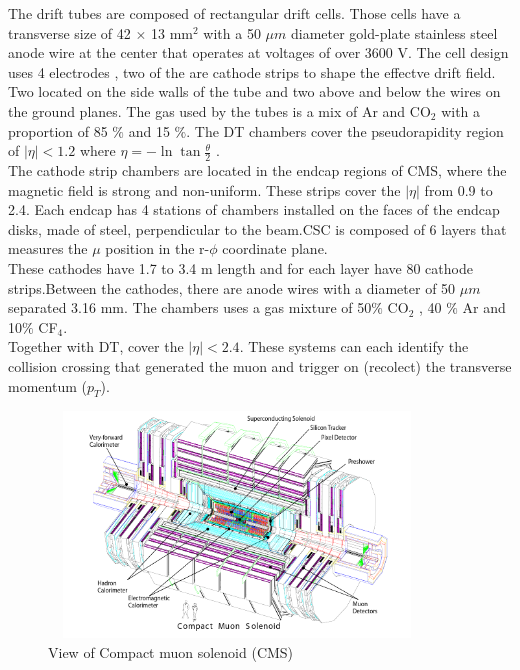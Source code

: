 \begin{linenumbers}
The drift tubes are composed of rectangular drift cells. Those cells have a transverse size of 42 $\times$ 13 mm$^2$ with a 50 $\mu m$ diameter gold-plate stainless steel anode wire at the center that operates at voltages of over 3600 V. The cell design uses 4 electrodes , two of the are cathode strips to shape the effectve drift field. Two located on the side walls of the tube and two above and below the wires on the ground planes. The gas used by the tubes is a mix of Ar and CO$_2$ with a proportion of 85 $\%$ and 15 $\%$. The DT chambers cover the pseudorapidity region of $|\eta|<1.2$ where $\eta=-\ln{\tan{\frac{\theta}{2}}}$\cite{cms7} .
\\

The cathode strip chambers are located in the endcap regions of CMS, where the magnetic field is strong and non-uniform. These strips cover the $|\eta|$ from 0.9 to 2.4. Each endcap has 4 stations of chambers installed on the faces of the endcap disks, made of steel, perpendicular to the beam.CSC is composed of 6 layers that measures the $\mu$ position in the r-$\phi$ coordinate plane. \\
These cathodes have 1.7 to 3.4 m length and for each layer have 80 cathode strips.Between the cathodes, there are anode wires with a diameter of 50 $\mu m$ separated 3.16 mm. 
The chambers uses a gas mixture of 50$\%$ CO$_2$ , 40 $\%$ Ar and 10$\%$ CF$_4$. \\

Together with DT, cover the $|\eta|< 2.4$. These systems can each identify the collision crossing that generated the muon and trigger on (recolect) the transverse momentum ($p_T$).  \cite{cms-manual,cms7}

\begin{figure}[!htbp]
\centering
\includegraphics[width=10cm,height=6cm]{Chapter2/cms2.png}
\caption{View of Compact muon solenoid (CMS)}\label{cms}
\end{figure}
	

\end{linenumbers}
